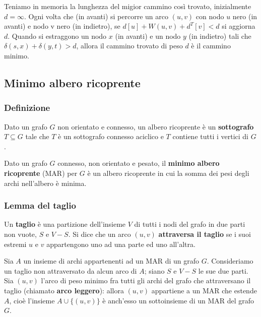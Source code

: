 \documentclass[11pt]{article}
\begin{document}
Teniamo in memoria la lunghezza del migior cammino così trovato, inizialmente $d=\infty$. Ogni volta che (in avanti) si percorre 
un arco $(u,v)$ con nodo $u$ nero (in avanti) e nodo v nero (in indietro), se $d[u]+W(u,v)+d^T[v]<d$ si aggiorna $d$.
Quando si estraggono un nodo $x$ (in avanti) e un nodo $y$ (in indietro) tali che $\delta(s,x)+\delta(y,t)>d$, allora il 
cammino trovato di peso $d$ è il cammino minimo.
\subsection{Minimo albero ricoprente}
\subsubsection{Definizione}
Dato un grafo $G$ non orientato e connesso, un albero ricoprente è un \textbf{sottografo} $T\subseteq G$ tale che $T$ è 
un sottografo connesso aciclico e $T$ contiene tutti i vertici di $G$.

Dato un grafo $G$ connesso, non orientato e pesato, il \textbf{minimo albero ricoprente} (MAR) per $G$ è un albero ricoprente 
in cui la somma dei pesi degli archi nell'albero è minima.
\subsubsection{Lemma del taglio}
Un \textbf{taglio} è una partizione dell'insieme $V$ di tutti i nodi del grafo in due parti non vuote, $S$ e $V-S$. Si dice 
che un arco $(u,v)$ \textbf{attraversa il taglio} se i suoi estremi $u$ e $v$ appartengono uno ad una parte ed uno all'altra.

Sia $A$ un insieme di archi appartenenti ad un MAR di un grafo $G$. Consideriamo un taglio non attraversato da alcun arco 
di $A$; siano $S$ e $V-S$ le sue due parti. Sia $(u,v)$ l'arco di peso minimo fra tutti gli archi del grafo che attraversano 
il taglio (chiamato \textbf{arco leggero}): allora $(u,v)$ appartiene a un MAR che estende $A$, cioè l'insieme $A\cup \{(u,v)\}$
è anch'esso un sottoinsieme di un MAR del grafo $G$. 
\end{document}
